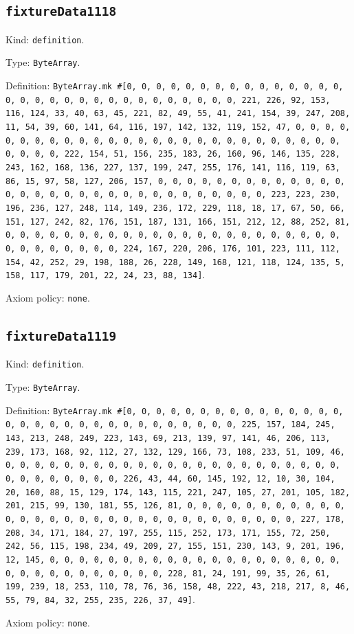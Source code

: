 \documentclass[11pt]{article}
\begin{document}
\subsection*{\texttt{fixtureData1118}}
\noindent Kind: \texttt{definition}.\par
\noindent Type: \texttt{ByteArray}.\par
\noindent Definition: \texttt{ByteArray.mk \#[0, 0, 0, 0, 0, 0, 0, 0, 0, 0, 0, 0, 0, 0, 0, 0, 0, 0, 0, 0, 0, 0, 0, 0, 0, 0, 0, 0, 0, 0, 0, 221, 226, 92, 153, 116, 124, 33, 40, 63, 45, 221, 82, 49, 55, 41, 241, 154, 39, 247, 208, 11, 54, 39, 60, 141, 64, 116, 197, 142, 132, 119, 152, 47, 0, 0, 0, 0, 0, 0, 0, 0, 0, 0, 0, 0, 0, 0, 0, 0, 0, 0, 0, 0, 0, 0, 0, 0, 0, 0, 0, 0, 0, 0, 0, 222, 154, 51, 156, 235, 183, 26, 160, 96, 146, 135, 228, 243, 162, 168, 136, 227, 137, 199, 247, 255, 176, 141, 116, 119, 63, 86, 15, 97, 58, 127, 206, 157, 0, 0, 0, 0, 0, 0, 0, 0, 0, 0, 0, 0, 0, 0, 0, 0, 0, 0, 0, 0, 0, 0, 0, 0, 0, 0, 0, 0, 0, 0, 0, 223, 223, 230, 196, 236, 127, 248, 114, 149, 236, 172, 229, 118, 18, 17, 67, 50, 66, 151, 127, 242, 82, 176, 151, 187, 131, 166, 151, 212, 12, 88, 252, 81, 0, 0, 0, 0, 0, 0, 0, 0, 0, 0, 0, 0, 0, 0, 0, 0, 0, 0, 0, 0, 0, 0, 0, 0, 0, 0, 0, 0, 0, 0, 0, 224, 167, 220, 206, 176, 101, 223, 111, 112, 154, 42, 252, 29, 198, 188, 26, 228, 149, 168, 121, 118, 124, 135, 5, 158, 117, 179, 201, 22, 24, 23, 88, 134]}.\par
\noindent Axiom policy: \texttt{none}.\par
\subsection*{\texttt{fixtureData1119}}
\noindent Kind: \texttt{definition}.\par
\noindent Type: \texttt{ByteArray}.\par
\noindent Definition: \texttt{ByteArray.mk \#[0, 0, 0, 0, 0, 0, 0, 0, 0, 0, 0, 0, 0, 0, 0, 0, 0, 0, 0, 0, 0, 0, 0, 0, 0, 0, 0, 0, 0, 0, 0, 225, 157, 184, 245, 143, 213, 248, 249, 223, 143, 69, 213, 139, 97, 141, 46, 206, 113, 239, 173, 168, 92, 112, 27, 132, 129, 166, 73, 108, 233, 51, 109, 46, 0, 0, 0, 0, 0, 0, 0, 0, 0, 0, 0, 0, 0, 0, 0, 0, 0, 0, 0, 0, 0, 0, 0, 0, 0, 0, 0, 0, 0, 0, 0, 226, 43, 44, 60, 145, 192, 12, 10, 30, 104, 20, 160, 88, 15, 129, 174, 143, 115, 221, 247, 105, 27, 201, 105, 182, 201, 215, 99, 130, 181, 55, 126, 81, 0, 0, 0, 0, 0, 0, 0, 0, 0, 0, 0, 0, 0, 0, 0, 0, 0, 0, 0, 0, 0, 0, 0, 0, 0, 0, 0, 0, 0, 0, 0, 227, 178, 208, 34, 171, 184, 27, 197, 255, 115, 252, 173, 171, 155, 72, 250, 242, 56, 115, 198, 234, 49, 209, 27, 155, 151, 230, 143, 9, 201, 196, 12, 145, 0, 0, 0, 0, 0, 0, 0, 0, 0, 0, 0, 0, 0, 0, 0, 0, 0, 0, 0, 0, 0, 0, 0, 0, 0, 0, 0, 0, 0, 0, 0, 228, 81, 24, 191, 99, 35, 26, 61, 199, 239, 18, 253, 110, 78, 76, 36, 158, 48, 222, 43, 218, 217, 8, 46, 55, 79, 84, 32, 255, 235, 226, 37, 49]}.\par
\noindent Axiom policy: \texttt{none}.\par
\end{document}

